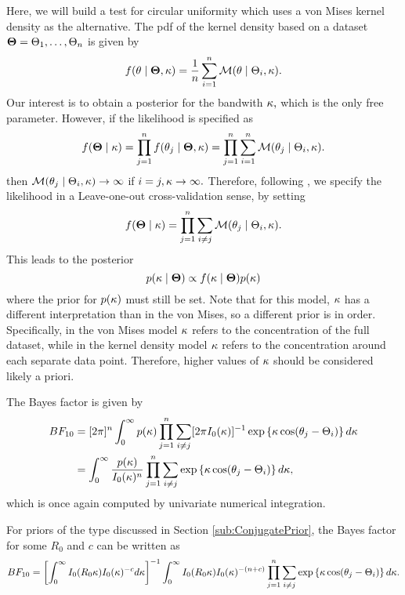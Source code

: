 Here, we will build a test for circular uniformity which uses a von Mises kernel density as the alternative. The pdf of the kernel density based on a dataset \( \boldsymbol{\Theta} = \Theta_1, \dots, \Theta_n \) is given by
\begin{equation}
  f (\theta \mid \boldsymbol{\Theta}, \kappa) = \frac{1}{n} \sum_{i = 1}^n \mathcal{M} (\theta \mid \Theta_i, \kappa).
\end{equation}
Our interest is to obtain a posterior for the bandwith \( \kappa, \) which is the only free parameter. However, if the likelihood is specified as
\begin{equation}
 f(\boldsymbol{\Theta} \mid \kappa) = \prod_{j = 1}^n f (\theta_j \mid \boldsymbol{\Theta}, \kappa) = \prod_{j = 1}^n \sum_{i = 1}^n \mathcal{M} (\theta_j \mid \Theta_i, \kappa).
\end{equation}
then \( \mathcal{M} (\theta_j \mid \Theta_i, \kappa) \rightarrow \infty \) if \( i = j, \kappa \rightarrow \infty. \) Therefore, following \citet{hall1987kernel}, we specify the likelihood in a Leave-one-out cross-validation sense, by setting
\begin{equation}
  f(\boldsymbol{\Theta} \mid \kappa) = \prod_{j = 1}^n \sum_{i \neq j } \mathcal{M} (\theta_j \mid \Theta_i, \kappa).
\end{equation}
This leads to the posterior
\begin{equation}
  p(\kappa \mid \boldsymbol{\Theta}) \propto f(\kappa \mid \boldsymbol{\Theta}) p(\kappa)
\end{equation}
where the prior for \( p(\kappa) \) must still be set. Note that for this model, \( \kappa \) has a different interpretation than in the von Mises, so a different prior is in order. Specifically, in the von Mises model \( \kappa \) refers to the concentration of the full dataset, while in the kernel density model \( \kappa \) refers to the concentration around each separate data point. Therefore, higher values of \( \kappa \) should be considered likely a priori.

The Bayes factor is given by
\begin{align}
  BF_{10} &= [2 \pi]^n \int_0^{\infty} p(\kappa) \prod_{j = 1}^n \sum_{i \neq j } [2 \pi I_0 (\kappa)]^{-1} \exp \left\{ \kappa \cos(\theta_j - \Theta_i) \right\} d\kappa \\
           &=  \int_0^{\infty}  \frac{p(\kappa)}{I_0(\kappa)^n} \prod_{j = 1}^n \sum_{i \neq j }  \exp \left\{ \kappa \cos(\theta_j - \Theta_i) \right\} d\kappa,
\end{align}
which is once again computed by univariate numerical integration.

For priors of the type discussed in Section \ref{sub:ConjugatePrior}, the Bayes factor for some \( R_0\) and \(c\) can be written as
\begin{equation}
 BF_{10} = \left[ \int_0^{\infty} I_0(R_0 \kappa) I_0(\kappa)^{-c} d\kappa \right]^{-1}  \int_0^{\infty} I_0(R_0 \kappa) I_0(\kappa)^{-(n+c)} \prod_{j = 1}^n \sum_{i \neq j }  \exp \left\{ \kappa \cos(\theta_j - \Theta_i) \right\} d\kappa.
\end{equation}

